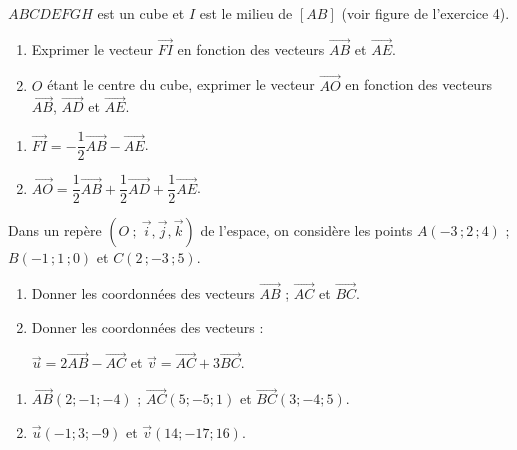 \documentclass{cornouaille}
\begin{document}
\begin{exercice}
  $ABCDEFGH$ est un cube et $I$ est le milieu de $[AB]$ (voir figure
  de l'exercice 4).

  \begin{enumerate}
  \item Exprimer le vecteur $\overrightarrow{FI}$ en fonction des
    vecteurs $\overrightarrow{AB}$ et $\overrightarrow{AE}$.
  \item $O$ étant le centre du cube, exprimer le vecteur
    $\overrightarrow{AO}$ en fonction des vecteurs
    $\overrightarrow{AB}$, $\overrightarrow{AD}$ et
    $\overrightarrow{AE}$.
  \end{enumerate}
\end{exercice}
\begin{solution}
  \begin{enumerate}
\item  $\overrightarrow{FI}=-\dfrac{1}{2}\overrightarrow{AB}-\overrightarrow{AE}$.
\item $\overrightarrow{AO}=\dfrac{1}{2}\overrightarrow{AB}+\dfrac{1}{2}\overrightarrow{AD}+\dfrac{1}{2}\overrightarrow{AE}$.
\end{enumerate}
\end{solution}

\begin{exercice}
  Dans un repère $(O\ ;\ \vec{i},\vec{j},\vec{k})$ de l'espace, on
  considère les points $A(-3\,;2\,;4)$ ; $B(-1\,;1\,;0)$ et $C(2\,;-3\,;5)$.
  \begin{enumerate}
  \item Donner les coordonnées des vecteurs $\overrightarrow{AB}$ ;
    $\overrightarrow{AC}$ et $\overrightarrow{BC}$.

  \item Donner les coordonnées des vecteurs :

    $\overrightarrow{u}=2\overrightarrow{AB}-\overrightarrow{AC}$ et
    $\overrightarrow{v}=\overrightarrow{AC}+3\overrightarrow{BC}$.
  \end{enumerate}
\end{exercice}
\begin{solution}
  \begin{enumerate}
\item  $\overrightarrow{AB}(2;-1;-4)$ ; $\overrightarrow{AC}(5;-5;1)$ et $\overrightarrow{BC}(3;-4;5)$.
\item 
$\overrightarrow{u}(-1;3;-9)$ et $\overrightarrow{v}(14;-17;16)$.
\end{enumerate}
\end{solution}
\end{document}
